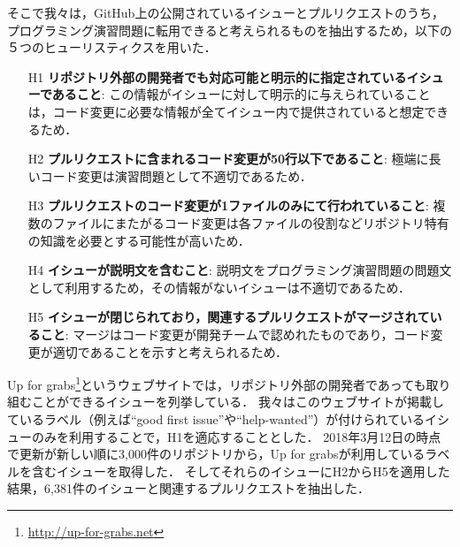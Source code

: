 そこで我々は，GitHub上の公開されているイシューとプルリクエストのうち，プログラミング演習問題に転用できると考えられるものを抽出するため，以下の５つのヒューリスティクスを用いた．
\begin{enumerate}
\item[H1] \textbf{リポジトリ外部の開発者でも対応可能と明示的に指定されているイシューであること}: この情報がイシューに対して明示的に与えられていることは，コード変更に必要な情報が全てイシュー内で提供されていると想定できるため．
\item[H2] \textbf{プルリクエストに含まれるコード変更が50行以下であること}: 極端に長いコード変更は演習問題として不適切であるため．
\item[H3] \textbf{プルリクエストのコード変更が1ファイルのみにて行われていること}: 複数のファイルにまたがるコード変更は各ファイルの役割などリポジトリ特有の知識を必要とする可能性が高いため．
\item[H4] \textbf{イシューが説明文を含むこと}: 説明文をプログラミング演習問題の問題文として利用するため，その情報がないイシューは不適切であるため．
\item[H5]  \textbf{イシューが閉じられており，関連するプルリクエストがマージされていること}: マージはコード変更が開発チームで認めれたものであり，コード変更が適切であることを示すと考えられるため．
\end{enumerate}

Up for grabs\footnote{\url{http://up-for-grabs.net}}というウェブサイトでは，リポジトリ外部の開発者であっても取り組むことができるイシューを列挙している．
我々はこのウェブサイトが掲載しているラベル（例えば``good first issue''や``help-wanted''）が付けられているイシューのみを利用することで，H1を適応することとした．
2018年3月12日の時点で更新が新しい順に3,000件のリポジトリから，Up for grabsが利用しているラベルを含むイシューを取得した．
そしてそれらのイシューにH2からH5を適用した結果，6,381件のイシューと関連するプルリクエストを抽出した．

